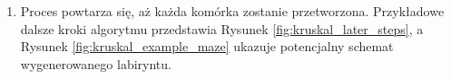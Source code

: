 \begin{enumerate}
    \item Proces powtarza się, aż każda komórka zostanie przetworzona. Przykładowe dalsze kroki algorytmu przedstawia Rysunek \ref{fig:kruskal_later_steps}, a Rysunek \ref{fig:kruskal_example_maze} ukazuje potencjalny schemat wygenerowanego labiryntu.
    
    

    
\end{enumerate}

\clearpage